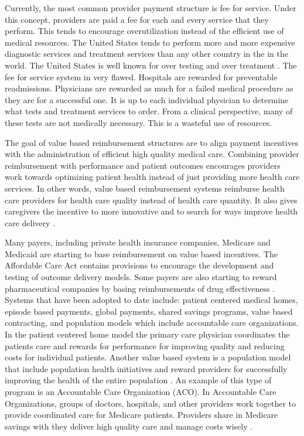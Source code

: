 \documentclass[sigconf]{acmart}
\begin{document}
Currently, the most common provider payment structure is fee for service. Under this concept, providers are paid a fee for each and every service that they perform. This tends to encourage overutilization instead of the efficient use of medical resources. The United States tends to perform more and more expensive diagnostic services and treatment services than any other country in the in the world. The United States is well known for over testing and over treatment \cite{www-google-PBSO}.  The fee for service system in very flawed. Hospitals are rewarded for preventable readmissions. Physicians are rewarded as much for a failed medical procedure as they are for a successful one.  It is up to each individual physician to determine what tests and treatment services to order.  From a clinical perspective, many of these tests are not medically necessary. This is a wasteful use of resources.

The goal of value based reimbursement structures are to align payment incentives with the administration of efficient high quality medical care. Combining provider reimbursement with performance and patient outcomes encourages providers work towards optimizing patient health instead of just providing more health care services. In other words, value based reimbursement systems reimburse health care providers for health care quality instead of health care quantity.   It also gives caregivers the incentive to more innovative and to search for ways improve health care delivery \cite{www-google-christian}.

Many payers, including private health insurance companies, Medicare and Medicaid are starting to base reimbursement on value based incentives. The Affordable Care Act contains provisions to encourage the development and testing of outcome delivery models.  Some payers are also starting to reward pharmaceutical companies by basing reimbursements of drug effectiveness \cite{www-google-McKinsey}. 
 Systems that have been adopted to date include: patient centered medical homes, episode based payments, global payments, shared savings programs, value based contracting, and population models which include accountable care organizations.  In the patient centered home model the primary care physician coordinates the patients care and rewards for performance for improving quality and reducing costs for individual patients. Another value based system is a population model that include population health initiatives and reward providers for successfully improving the health of the entire population \cite{www-google-liason}. An example of this type of program is an Accountable Care Organization (ACO). In Accountable Care Organizations, groups of doctors, hospitals, and other providers work together to provide coordinated care for Medicare patients. Providers share in Medicare savings with they deliver high quality care and manage costs wisely \cite{www-google-ACO}.
 
\end{document}
